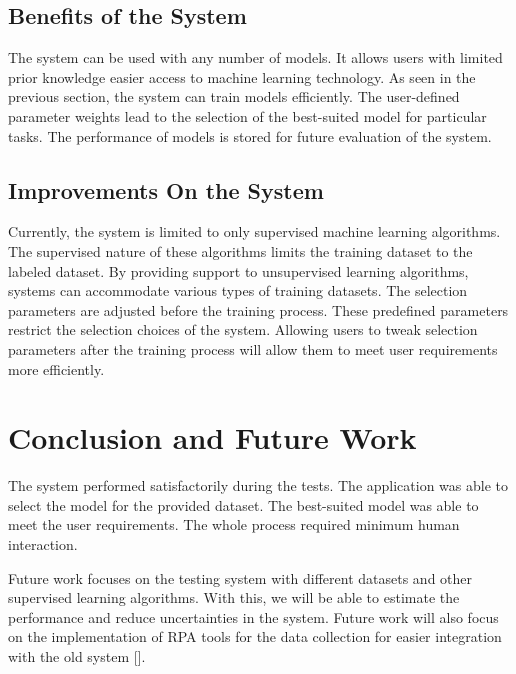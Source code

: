 \documentclass[a4paper,fleqn]{cas-dc}
\begin{document}
\subsection{Benefits of the System}\label{subsec:benefits_of_system}

The system can be used with any number of models. It allows users with limited prior knowledge easier access to machine learning technology. As seen in the previous section, the system can train models efficiently. The user-defined parameter weights lead to the selection of the best-suited model for particular tasks. The performance of models is stored for future evaluation of the system.

\subsection{Improvements On the System}\label{subsec:improvements_on_system}

Currently, the system is limited to only supervised machine learning algorithms. The supervised nature of these algorithms limits the training dataset to the labeled dataset. By providing support to unsupervised learning algorithms, systems can accommodate various types of training datasets. The selection parameters are adjusted before the training process. These predefined parameters restrict the selection choices of the system. Allowing users to tweak selection parameters after the training process will allow them to meet user requirements more efficiently.

\section{Conclusion and Future Work}\label{sec:conclusion_and_futur_work}

The system performed satisfactorily during the tests. The application was able to select the model for the provided dataset. The best-suited model was able to meet the user requirements. The whole process required minimum human interaction.

Future work focuses on the testing system with different datasets and other supervised learning algorithms. With this, we will be able to estimate the performance and reduce uncertainties in the system. Future work will also focus on the implementation of RPA tools for the data collection for easier integration with the old system [].


\end{document}
